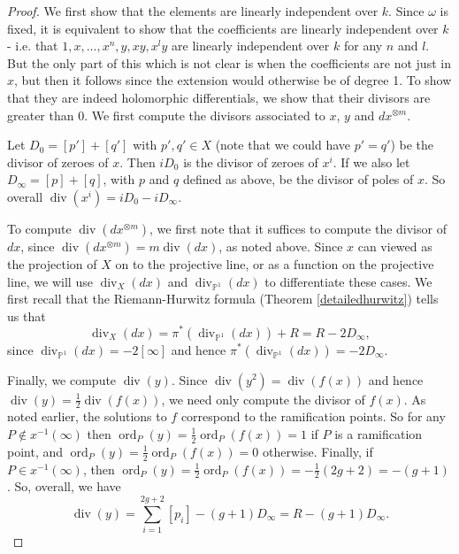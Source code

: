 \documentclass[11pt]{article} %
\theoremstyle{plain}
\theoremstyle{remark}
\newcommand{\cL}{{\mathcal L}}
\DeclareMathOperator{\ord}{ord}
\DeclareMathOperator{\di}{div}
\begin{document}
\begin{proof}
We first show that the elements are linearly independent over $k$.
Since $\omega$ is fixed, it is equivalent to show that the coefficients are linearly independent over $k$ - i.e. that $1,x,\ldots ,x^n, y, xy, x^ly$ are linearly independent over $k$ for any $n$ and $l$.
But the only part of this which is not clear is when the coefficients are not just in $x$, but then it follows since the extension would otherwise be of degree 1.
To show that they are indeed holomorphic differentials, we show that their divisors are greater than $0$.
We first compute the divisors associated to $x$, $y$ and $dx^{\otimes m}$.
\begin{comment}
For any $f\in K(X)$ we will denote by $(f)_0$ and $(f)_\infty$ the divisor of zeroes and divisor of poles of $f$ respectively.
In particular, 
\[
          (f)_0 := \sum_{\{P\in X|\ord_P(f)>0\}}\ord_P(f)[P],      
 \]
 and 
 \[
 (f)_\infty = \sum_{\{P\in X |\ord_P(f)<0\}} -\ord_P(f)[P].
 \]
\end{comment}

Let $D_0 = [p']+[q']$ with $p',q' \in X$ (note that we could have $p' = q'$) be the divisor of zeroes of $x$. 
Then $ i D_0$ is the divisor of zeroes of $x^i$. 
If we also let $D_\infty = [p] + [q]$, with $p$ and $q$ defined as above, be the divisor of poles of $x$. 
So overall $\di (x^i) = i D_0 - i D_\infty$.


To compute $\di (dx^{\otimes m})$, we first note that it suffices to compute the divisor of $dx$, since $\di (dx^{\otimes m}) =m\di (dx)$, as noted above.
Since $x$ can viewed as the projection of $X$ on to the projective line, or as a function on the projective line, we will use $\di_X (dx)$ and $\di_{\mathbb P^1} (dx)$ to differentiate these cases.
We first recall that the Riemann-Hurwitz formula (Theorem \ref{detailedhurwitz}) tells us that
\[
 \di_X (dx) = \pi^*( \di_{\mathbb P^1}(dx)) + R = R - 2D_{\infty},
\]
since $\di_{\mathbb P^1}(dx) = -2[\infty]$ and hence $\pi^* (\di_{\mathbb P^1}(dx)) = -2D_\infty$.

Finally, we compute $\di (y)$.
Since $\di (y^2) = \di (f(x))$ and hence $\di(y) = \frac{1}{2}\di(f(x))$, we need only compute the divisor of $f(x)$.
As noted earlier, the solutions to $f$ correspond to the ramification points.
So for any $P\notin x^{-1}(\infty)$ then $\ord_P(y) =  \frac{1}{2}\ord_P(f(x)) = 1$ if $P$ is a ramification point, and $\ord_P(y) = \frac{1}{2}\ord_P(f(x)) = 0$ otherwise.
Finally, if $P\in x^{-1}(\infty)$, then $\ord_P(y)  = \frac{1}{2}\ord_P(f(x)) = - \frac{1}{2} (2g+2) = -(g+1)$.
So, overall, we have 
\[
 \di(y) = \sum_{i=1}^{2g+2} [p_i]- (g+1)D_\infty = R - (g+1)D_{\infty}.
 \]
\begin{comment}
Firstly, since $y(p_i)= y(j(p_i)) = j^*(y)(p_i)= -y(p_i)$ for all $i$ we see that $y(p_i)=0$.
Therefore $\deg(y)_0 \geq \deg\left(\sum_{i = 1}^{2g +2} [p_i] \right) = 2g+2$.
But since $y\in \cL(D)$, we know that $\deg(y)_{\infty} \leq \deg((g+1)D) = 2g + 2$, and as $\deg(y) = \deg(y)_0 - \deg(y)_{\infty} = 0$ then $\deg(y)_0 = \deg(y)_{\infty} = 2g+2$.
So
\[
 (y)_0 = \sum_{i=1}^{2g+2} [p_i], \ (y)_{\infty} = (g+1)D_\infty.
\]
\end{comment}


\end{proof}
\end{document}
